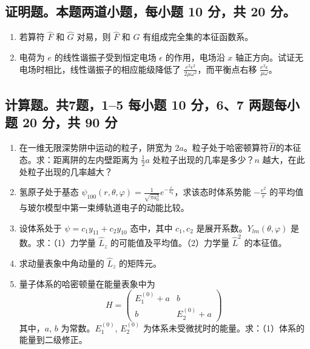 \subsection{证明题。本题两道小题，每小题 10 分，共 20 分。}
\begin{enumerate}
    \item 若算符 $\hat{F}$ 和 $\hat{G}$ 对易，则 $\hat{F}$ 和 $\hat{G}$ 有组成完全集的本征函数系。
    \item 电荷为 $e$ 的线性谐振子受到恒定电场 $\epsilon$ 的作用，电场沿 $x$ 轴正方向。试证无电场时相比，线性谐振子的相应能级降低了 $\frac{e^2 \epsilon^2}{2\mu \omega^2}$，而平衡点右移 $\frac{e^2 \epsilon}{\mu \omega}$。
\end{enumerate}
\subsection{计算题。共7题，1--5 每小题 10 分，6、7 两题每小题 20 分，共 90 分}
\begin{enumerate}
    \item 在一维无限深势阱中运动的粒子，阱宽为 $2a$。粒子处于哈密顿算符$\hat H$的本征态。求：距离阱的左内壁距离为 $\frac{1}{2}a$ 处粒子出现的几率是多少？$n$ 越大，在此处粒子出现的几率越大？
    \item 氢原子处于基态 $\psi_{100} (r, \theta, \varphi) = \frac{1}{\sqrt{\pi a_0^3}} e^{- \frac{r}{a_0}}$，求该态时体系势能 $-\frac{e^2}{r}$ 的平均值与玻尔模型中第一束缚轨道电子的动能比较。
    \item 设体系处于 $\psi = c_1 y_{11} + c_2 y_{10}$ 态中，其中 $c_1, c_2$ 是展开系数。$Y_{lm}(\theta, \varphi)$ 是数。求：（1）力学量 $\hat L_z$ 的可能值及平均值。（2）力学量 $\hat L^2$ 的本征值。
    \item 求动量表象中角动量的 $\hat{L}_z$ 的矩阵元。
    \item 量子体系的哈密顿量在能量表象中为
    \[
    H = 
    \begin{pmatrix}
    E_1^{(0)} + a & b \\
    b & E_2^{(0)} + a
    \end{pmatrix}~
    \]
    其中，$a$, $b$ 为常数。$E_1^{(0)}$, $E_2^{(0)}$ 为体系未受微扰时的能量。求：（1）体系的能量到二级修正。
\end{enumerate}
